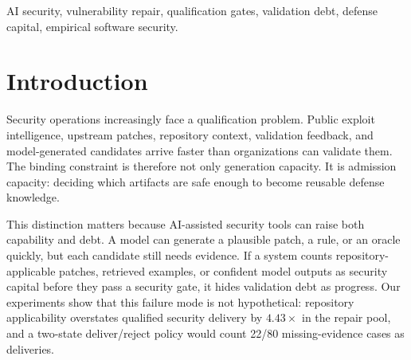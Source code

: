 ﻿\documentclass[lettersize,journal]{IEEEtran}
\begin{document}
\begin{abstract}
The boundary is also explicit. A patch-differential oracle cross-check validates 55/99 strict ASR admissions, with Wilson 95\% CI 0.457--0.650, and has a 15.1\% cross-category false-validation rate, so it is reported as boundary evidence rather than behavioral proof. To anchor the gate in executable behavior, a dynamic-oracle audit validates 23/23 parent-fails/upstream-passes tasks, with Wilson lower bound 0.857, but this remains oracle validation rather than repair success. The frozen 30-task all-gate repair run yields 1/30 primary security-qualified delivery and 0/30 original deployment-qualified deliveries; one same-candidate recovered-native all-gate case is reported separately as post-hoc existence evidence. The KEV activation analysis yields calibrated frontiers of 0.275 and 0.325, reproduced from saved replay curves, showing when CEC activation should fall back to AEC-only. MDDC therefore claims a reproducible measurement and admission-control method for AI defense capital, not automatic AI repair or deployment-level superiority.
\end{abstract}

\begin{IEEEkeywords}
AI security, vulnerability repair, qualification gates, validation debt, defense capital, empirical software security.
\end{IEEEkeywords}

\section{Introduction}
Security operations increasingly face a qualification problem. Public exploit intelligence, upstream patches, repository context, validation feedback, and model-generated candidates arrive faster than organizations can validate them. The binding constraint is therefore not only generation capacity. It is admission capacity: deciding which artifacts are safe enough to become reusable defense knowledge.

This distinction matters because AI-assisted security tools can raise both capability and debt. A model can generate a plausible patch, a rule, or an oracle quickly, but each candidate still needs evidence. If a system counts repository-applicable patches, retrieved examples, or confident model outputs as security capital before they pass a security gate, it hides validation debt as progress. Our experiments show that this failure mode is not hypothetical: repository applicability overstates qualified security delivery by $4.43\times$ in the repair pool, and a two-state deliver/reject policy would count 22/80 missing-evidence cases as deliveries.
\end{document}
